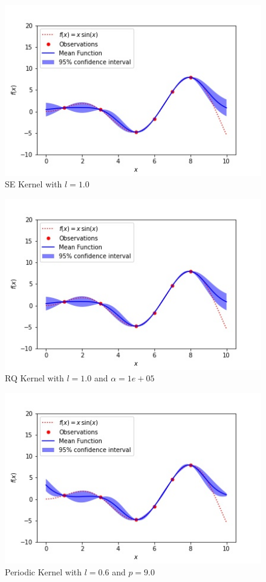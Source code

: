 \documentclass{article}
\begin{document}
\begin{figure}
\centering
  \includegraphics[scale=0.6]{RBF.jpg}
  \caption{SE Kernel with $l=1.0$}
  \label{fig:SE}
\end{figure}
\begin{figure}
\centering
  \includegraphics[scale=0.6]{RQ.jpg}
  \caption{RQ Kernel with $l = 1.0$ and $\alpha = 1e+05$}
  \label{fig:RQ}
\end{figure}
\begin{figure}
\centering
  \includegraphics[scale=0.6]{Per.jpg}
  \caption{Periodic Kernel with $l = 0.6$ and $p = 9.0$}
  \label{fig:Per}
\end{figure}
\end{document}
